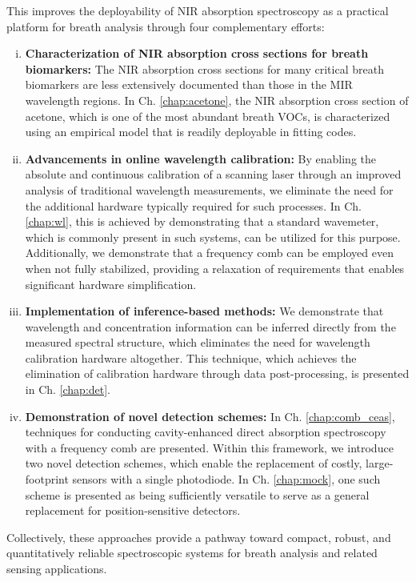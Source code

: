 \documentclass[8pt,a4paper]{report}
\begin{document}
	This improves the deployability of NIR absorption spectroscopy as a practical platform for breath analysis through four complementary efforts:
	\begin{enumerate}[(i)]
		\item \textbf{Characterization of NIR absorption cross sections for breath biomarkers:} The NIR absorption cross sections for many critical breath biomarkers are less extensively documented than those in the MIR wavelength regions. In Ch. \ref{chap:acetone}, the NIR absorption cross section of acetone, which is one of the most abundant breath VOCs, is characterized using an empirical model that is readily deployable in fitting codes.
		\item \textbf{Advancements in online wavelength calibration:} By enabling the absolute and continuous calibration of a scanning laser through an improved analysis of traditional wavelength measurements, we eliminate the need for the additional hardware typically required for such processes. In Ch. \ref{chap:wl}, this is achieved by demonstrating that a standard wavemeter, which is commonly present in such systems, can be utilized for this purpose. Additionally, we demonstrate that a frequency comb can be employed even when not fully stabilized, providing a relaxation of requirements that enables significant hardware simplification.
		\item \textbf{Implementation of inference-based methods:} We demonstrate that wavelength and concentration information can be inferred directly from the measured spectral structure, which eliminates the need for wavelength calibration hardware altogether. This technique, which achieves the elimination of calibration hardware through data post-processing, is presented in Ch. \ref{chap:det}.
		\item \textbf{Demonstration of novel detection schemes:} In Ch. \ref{chap:comb_ceas}, techniques for conducting cavity-enhanced direct absorption spectroscopy with a frequency comb are presented. Within this framework, we introduce two novel detection schemes, which enable the replacement of costly, large-footprint sensors with a single photodiode. In Ch. \ref{chap:mock}, one such scheme is presented as being sufficiently versatile to serve as a general replacement for position-sensitive detectors.
	\end{enumerate}
	Collectively, these approaches provide a pathway toward compact, robust, and quantitatively reliable spectroscopic systems for breath analysis and related sensing applications.
	
\end{document}
